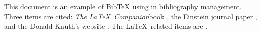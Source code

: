 \documentclass{article}
\begin{document}
This document is an example of BibTeX using in bibliography management. Three items are cited: \textit{The \LaTeX\ Companion}book \cite{latexcompanion}, the Einstein journal paper \cite{einstein}, and the Donald Knuth's website \cite{knuthwebsite}. The \LaTeX\ related items are \cite{latexcompanion,knuthwebsite}. 		
	
\medskip
		



		
\end{document}
